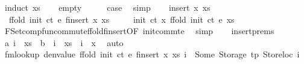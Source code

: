 \begin{isabellebody}
%
\isadelimproof
%
\endisadelimproof
%
\isatagproof
{}\isamarkupfalse%
\ {\isacharparenleft}{\kern0pt}induct\ {\isachardoublequoteopen}xs{\isachardoublequoteclose}{\isacharparenright}{\kern0pt}\isanewline
\ \ \isamarkupfalse%
\ empty\isanewline
\ \ \isamarkupfalse%
\ \isamarkupfalse%
\ {\isacharquery}{\kern0pt}case\ \isamarkupfalse%
\ simp\isanewline
{}\isamarkupfalse%
\isanewline
\ \ \isamarkupfalse%
\ {\isacharparenleft}{\kern0pt}insert\ x\ xs{\isacharparenright}{\kern0pt}\isanewline
\ \ \isamarkupfalse%
\ \isamarkupfalse%
\ {\isacharasterisk}{\kern0pt}{\isacharcolon}{\kern0pt}\ {\isachardoublequoteopen}ffold\ {\isacharparenleft}{\kern0pt}init\ ct{\isacharparenright}{\kern0pt}\ e\ {\isacharparenleft}{\kern0pt}finsert\ x\ xs{\isacharparenright}{\kern0pt}\ {\isacharequal}{\kern0pt}\isanewline
\ \ \ \ init\ ct\ x\ {\isacharparenleft}{\kern0pt}ffold\ {\isacharparenleft}{\kern0pt}init\ ct{\isacharparenright}{\kern0pt}\ e\ xs{\isacharparenright}{\kern0pt}{\isachardoublequoteclose}\ \isamarkupfalse%
\ FSet{\isachardot}{\kern0pt}comp{\isacharunderscore}{\kern0pt}fun{\isacharunderscore}{\kern0pt}commute{\isachardot}{\kern0pt}ffold{\isacharunderscore}{\kern0pt}finsert{\isacharbrackleft}{\kern0pt}OF\ init{\isacharunderscore}{\kern0pt}commte{\isacharbrackright}{\kern0pt}\ \isamarkupfalse%
\ simp\isanewline
\isanewline
\ \ \isamarkupfalse%
\ insert{\isachardot}{\kern0pt}prems\ \isamarkupfalse%
\ {\isacharparenleft}{\kern0pt}a{\isacharparenright}{\kern0pt}\ {\isachardoublequoteopen}i\ {\isacharbar}{\kern0pt}{\isasymin}{\isacharbar}{\kern0pt}\ xs{\isachardoublequoteclose}\ {\isacharbar}{\kern0pt}\ {\isacharparenleft}{\kern0pt}b{\isacharparenright}{\kern0pt}\ {\isachardoublequoteopen}{\isasymnot}\ i\ {\isacharbar}{\kern0pt}{\isasymin}{\isacharbar}{\kern0pt}\ xs\ {\isasymand}\ i\ {\isacharequal}{\kern0pt}\ x{\isachardoublequoteclose}\ \isamarkupfalse%
\ auto\isanewline
\ \ \isamarkupfalse%
\ \isamarkupfalse%
\ {\isachardoublequoteopen}fmlookup\ {\isacharparenleft}{\kern0pt}denvalue\ {\isacharparenleft}{\kern0pt}ffold\ {\isacharparenleft}{\kern0pt}init\ ct{\isacharparenright}{\kern0pt}\ e\ {\isacharparenleft}{\kern0pt}finsert\ x\ xs{\isacharparenright}{\kern0pt}{\isacharparenright}{\kern0pt}{\isacharparenright}{\kern0pt}\ i\ {\isacharequal}{\kern0pt}\ Some\ {\isacharparenleft}{\kern0pt}Storage\ tp{\isacharcomma}{\kern0pt}\ Storeloc\ i{\isacharparenright}{\kern0pt}{\isachardoublequoteclose}\isanewline

\end{isabellebody}
